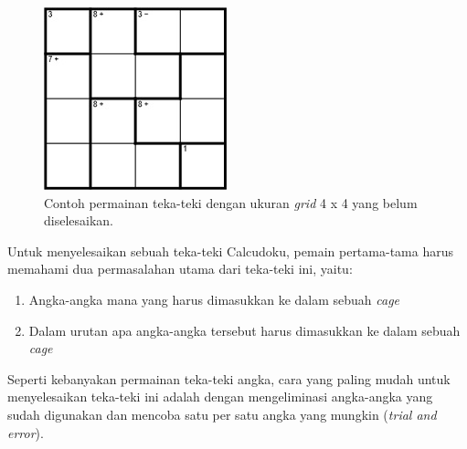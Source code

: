 \begin{figure}
\centering
\captionsetup{justification=centering}
\includegraphics[scale=0.75]{Gambar/Backtracking1}
\caption[Contoh permainan teka-teki Calcudoku dengan ukuran \textit{grid} 4 x 4 yang belum diselesaikan. ~\cite{fahda:16:backtracking}]{Contoh permainan teka-teki dengan ukuran \textit{grid} 4 x 4 yang belum diselesaikan. ~\cite{fahda:16:backtracking}}
\label{fig:backtracking1}
\end{figure}

Untuk menyelesaikan sebuah teka-teki Calcudoku, pemain pertama-tama harus memahami dua permasalahan utama dari teka-teki ini, yaitu:
\begin{enumerate}
\item Angka-angka mana yang harus dimasukkan ke dalam sebuah \textit{cage}
\item Dalam urutan apa angka-angka tersebut harus dimasukkan ke dalam sebuah \textit{cage}
\end{enumerate}

Seperti kebanyakan permainan teka-teki angka, cara yang paling mudah untuk menyelesaikan teka-teki ini adalah dengan mengeliminasi angka-angka yang sudah digunakan dan mencoba satu per satu angka yang mungkin (\textit{trial and error}). 

